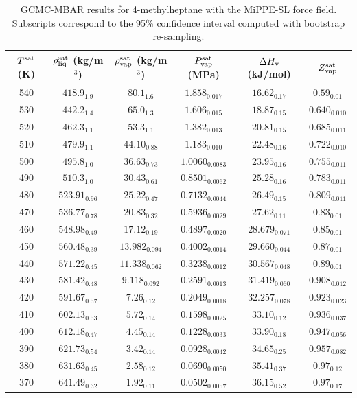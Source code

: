 \documentclass[journal=jctc,manuscript=article]{achemso}
\begin{document}
\begin{table}[htb!]
	\caption{GCMC-MBAR results for 4-methylheptane with the MiPPE-SL force field. Subscripts correspond to the 95\% confidence interval computed with bootstrap re-sampling.}
	\begin{center}
		\begin{tabular}{|c|c|c|c|c|c|}
			\hline
			$T^{\rm sat}$ (K) & $\rho_{\rm liq}^{\rm sat}$ (kg/m$^3$) & $\rho_{\rm vap}^{\rm sat}$ (kg/m$^3$) & $P_{\rm vap}^{\rm sat}$ (MPa) & $\Delta H_{\rm v}$ (kJ/mol) & $Z_{\rm vap}^{\rm sat}$ \\ \hline
			540 & $418.9_{1.9}$ & $80.1_{1.6}$ & $1.858_{0.017}$ & $16.62_{0.17}$ & $0.59_{0.01}$ \\
			530 & $442.2_{1.4}$ & $65.0_{1.3}$ & $1.606_{0.015}$ & $18.87_{0.15}$ & $0.640_{0.010}$ \\
			520 & $462.3_{1.1}$ & $53.3_{1.1}$ & $1.382_{0.013}$ & $20.81_{0.15}$ & $0.685_{0.011}$ \\
			510 & $479.9_{1.1}$ & $44.10_{0.88}$ & $1.183_{0.010}$ & $22.48_{0.16}$ & $0.722_{0.010}$ \\
			500 & $495.8_{1.0}$ & $36.63_{0.73}$ & $1.0060_{0.0083}$ & $23.95_{0.16}$ & $0.755_{0.011}$ \\
			490 & $510.3_{1.0}$ & $30.43_{0.61}$ & $0.8501_{0.0062}$ & $25.28_{0.16}$ & $0.783_{0.011}$ \\
			480 & $523.91_{0.96}$ & $25.22_{0.47}$ & $0.7132_{0.0044}$ & $26.49_{0.15}$ & $0.809_{0.011}$ \\
			470 & $536.77_{0.78}$ & $20.83_{0.32}$ & $0.5936_{0.0029}$ & $27.62_{0.11}$ & $0.83_{0.01}$ \\
			460 & $548.98_{0.49}$ & $17.12_{0.19}$ & $0.4897_{0.0020}$ & $28.679_{0.071}$ & $0.85_{0.01}$ \\
			450 & $560.48_{0.39}$ & $13.982_{0.094}$ & $0.4002_{0.0014}$ & $29.660_{0.044}$ & $0.87_{0.01}$ \\
			440 & $571.22_{0.45}$ & $11.338_{0.062}$ & $0.3238_{0.0012}$ & $30.567_{0.048}$ & $0.89_{0.01}$ \\
			430 & $581.42_{0.48}$ & $9.118_{0.092}$ & $0.2591_{0.0013}$ & $31.419_{0.060}$ & $0.908_{0.012}$ \\
			420 & $591.67_{0.57}$ & $7.26_{0.12}$ & $0.2049_{0.0018}$ & $32.257_{0.078}$ & $0.923_{0.023}$ \\
			410 & $602.13_{0.53}$ & $5.72_{0.14}$ & $0.1598_{0.0025}$ & $33.10_{0.12}$ & $0.936_{0.037}$ \\
			400 & $612.18_{0.47}$ & $4.45_{0.14}$ & $0.1228_{0.0033}$ & $33.90_{0.18}$ & $0.947_{0.056}$ \\
			390 & $621.73_{0.54}$ & $3.42_{0.14}$ & $0.0928_{0.0042}$ & $34.65_{0.25}$ & $0.957_{0.082}$ \\
			380 & $631.63_{0.45}$ & $2.58_{0.12}$ & $0.0690_{0.0050}$ & $35.41_{0.37}$ & $0.97_{0.12}$ \\
			370 & $641.49_{0.32}$ & $1.92_{0.11}$ & $0.0502_{0.0057}$ & $36.15_{0.52}$ & $0.97_{0.17}$ \\
			\hline
		\end{tabular}
	\end{center}
\end{table}
\end{document}
